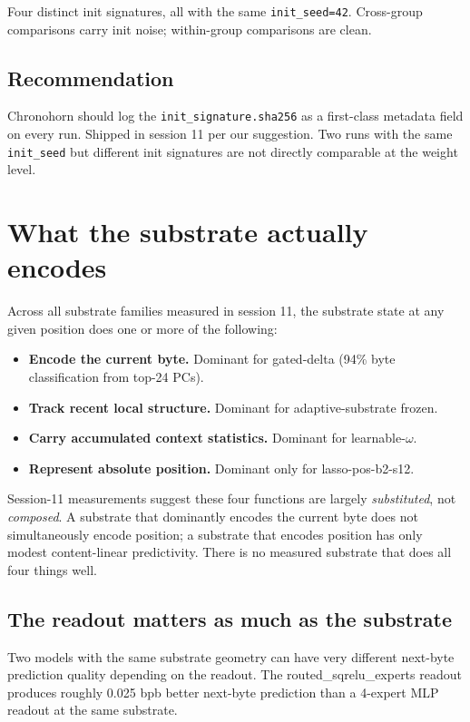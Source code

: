 \documentclass[11pt,openany]{book}
\begin{document}
Four distinct init signatures, all with the same
\texttt{init\_seed=42}. Cross-group comparisons carry init noise;
within-group comparisons are clean.

\section{Recommendation}

Chronohorn should log the \texttt{init\_signature.sha256} as a
first-class metadata field on every run. Shipped in session 11 per
our suggestion. Two runs with the same \texttt{init\_seed} but
different init signatures are not directly comparable at the weight
level.

\chapter{What the substrate actually encodes}

Across all substrate families measured in session 11, the substrate
state at any given position does one or more of the following:

\begin{itemize}
  \item \textbf{Encode the current byte.} Dominant for gated-delta
  (94\% byte classification from top-24 PCs).
  \item \textbf{Track recent local structure.} Dominant for
  adaptive-substrate frozen.
  \item \textbf{Carry accumulated context statistics.} Dominant for
  learnable-$\omega$.
  \item \textbf{Represent absolute position.} Dominant only for
  lasso-pos-b2-s12.
\end{itemize}

Session-11 measurements suggest these four functions are largely
\emph{substituted}, not \emph{composed}. A substrate that dominantly
encodes the current byte does not simultaneously encode position; a
substrate that encodes position has only modest content-linear
predictivity. There is no measured substrate that does all four
things well.

\section{The readout matters as much as the substrate}

Two models with the same substrate geometry can have very different
next-byte prediction quality depending on the readout. The
routed\_sqrelu\_experts readout produces roughly 0.025 bpb better
next-byte prediction than a 4-expert MLP readout at the same substrate.
\end{document}
